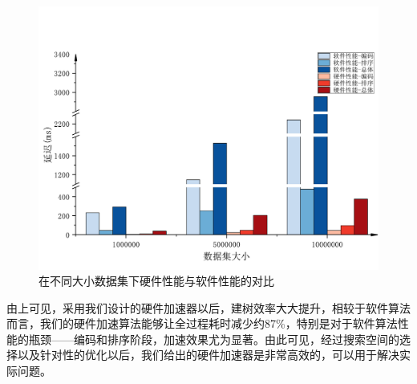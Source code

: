 \begin{figure}[htbp]
    \centering
    \includegraphics[width=\linewidth]{figures/Octree.pdf}
    \caption{在不同大小数据集下硬件性能与软件性能的对比}
    \label{fig:Octree_comparison}
\end{figure}


由上可见，采用我们设计的硬件加速器以后，建树效率大大提升，相较于软件算法而言，我们的硬件加速算法能够让全过程耗时减少约87\%，特别是对于软件算法性能的瓶颈——编码和排序阶段，加速效果尤为显著。由此可见，经过搜索空间的选择以及针对性的优化以后，我们给出的硬件加速器是非常高效的，可以用于解决实际问题。

